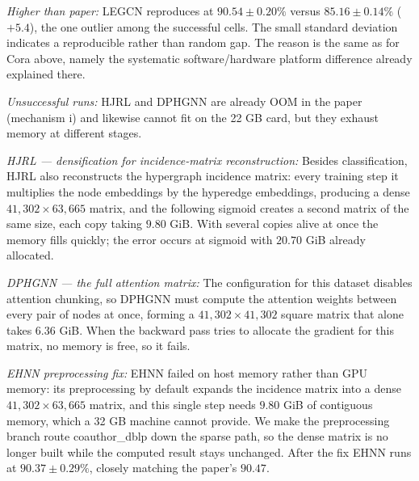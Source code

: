 \documentclass[11pt,a4paper]{article}
\begin{document}
\noindent\textit{Higher than paper:} LEGCN reproduces at $90.54\pm0.20\%$ versus $85.16\pm0.14\%$ ($+5.4$), the one outlier among the successful cells. The small standard deviation indicates a reproducible rather than random gap. The reason is the same as for Cora above, namely the systematic software/hardware platform difference already explained there.

\noindent\textit{Unsuccessful runs:} HJRL and DPHGNN are already OOM in the paper (mechanism i) and likewise cannot fit on the 22 GB card, but they exhaust memory at different stages.

\noindent\textit{HJRL — densification for incidence-matrix reconstruction:} Besides classification, HJRL also reconstructs the hypergraph incidence matrix: every training step it multiplies the node embeddings by the hyperedge embeddings, producing a dense $41{,}302\times63{,}665$ matrix, and the following sigmoid creates a second matrix of the same size, each copy taking $9.80$ GiB. With several copies alive at once the memory fills quickly; the error occurs at sigmoid with $20.70$ GiB already allocated.

\noindent\textit{DPHGNN — the full attention matrix:} The configuration for this dataset disables attention chunking, so DPHGNN must compute the attention weights between every pair of nodes at once, forming a $41{,}302\times41{,}302$ square matrix that alone takes $6.36$ GiB. When the backward pass tries to allocate the gradient for this matrix, no memory is free, so it fails.

\noindent\textit{EHNN preprocessing fix:} EHNN failed on host memory rather than GPU memory: its preprocessing by default expands the incidence matrix into a dense $41{,}302\times63{,}665$ matrix, and this single step needs $9.80$ GiB of contiguous memory, which a 32 GB machine cannot provide. We make the preprocessing branch route coauthor\_dblp down the sparse path, so the dense matrix is no longer built while the computed result stays unchanged. After the fix EHNN runs at $90.37\pm0.29\%$, closely matching the paper's $90.47$.
\end{document}
